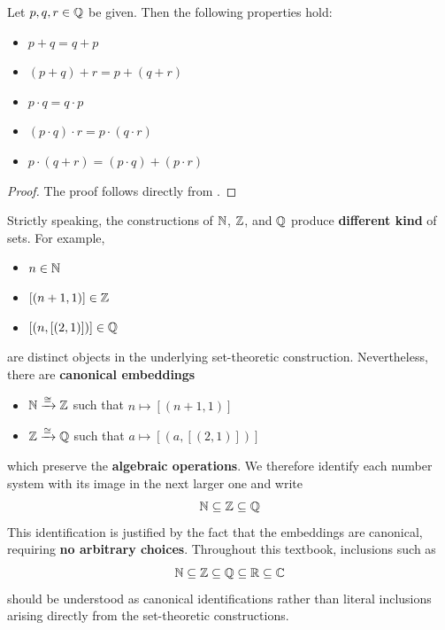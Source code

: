 \bigskip

\begin{theorem} \label{an:thm:properties-of-operations-on-Q}
    Let $p, q, r \in \mathbb{Q}$ be given. Then the following properties hold:
    \begin{itemize}
        \item $p + q = q + p$
        \item $(p + q) + r = p + (q + r)$
        \item $p \cdot q = q \cdot p$
        \item $(p \cdot q) \cdot r = p \cdot (q \cdot r)$
        \item $p \cdot (q + r) = (p \cdot q) + (p \cdot r)$
    \end{itemize}
\end{theorem}

\begin{proof}
    The proof follows directly from .
\end{proof}

\bigskip

\begin{remark}
Strictly speaking, the constructions of $\mathbb{N}$, $\mathbb{Z}$, and $\mathbb{Q}$ produce \textbf{different kind} of sets. For example,
\begin{itemize}
    \item $n \in \mathbb{N}$
    \item $[(n + 1, 1)] \in \mathbb{Z}$
    \item $[(n, [(2, 1)])] \in \mathbb{Q}$
\end{itemize}
are distinct objects in the underlying set-theoretic construction. Nevertheless, there are \textbf{canonical embeddings}
\begin{itemize}
    \item $\mathbb{N} \xrightarrow{\cong} \mathbb{Z}$ such that $n \mapsto [(n + 1, 1)]$
    \item $\mathbb{Z} \xrightarrow{\cong} \mathbb{Q}$ such that $a \mapsto [(a, [(2, 1)])]$
\end{itemize}
which preserve the \textbf{algebraic operations}. We therefore identify
each number system with its image in the next larger one and write
\[
\mathbb{N} \subseteq \mathbb{Z} \subseteq \mathbb{Q}
\]
This identification is justified by the fact that the embeddings are canonical,
requiring \textbf{no arbitrary choices}. Throughout this textbook, inclusions such as
\[
\mathbb{N} \subseteq \mathbb{Z} \subseteq \mathbb{Q} \subseteq \mathbb{R} \subseteq \mathbb{C}
\]
should be understood as canonical identifications rather than
literal inclusions arising directly from the set-theoretic constructions.
\end{remark}

